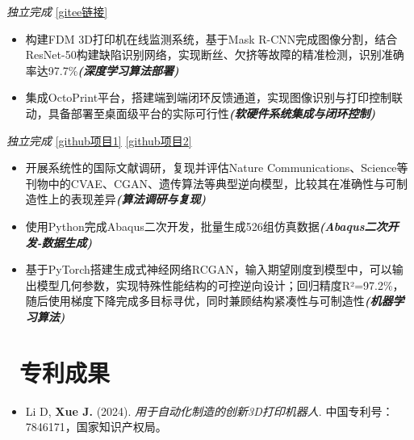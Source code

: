 \documentclass{resume}
\newcommand{\fapatent}{\faCopyright}
\begin{document}
\textit{独立完成} \href{https://gitee.com/jcXue/graduation-design.git}{[gitee链接]}
\begin{itemize}
  \item 构建FDM 3D打印机在线监测系统，基于Mask R-CNN完成图像分割，结合ResNet-50构建缺陷识别网络，实现断丝、欠挤等故障的精准检测，识别准确率达97.7\%\textit{\textbf{(深度学习算法部署)}}
  \item 集成OctoPrint平台，搭建端到端闭环反馈通道，实现图像识别与打印控制联动，具备部署至桌面级平台的实际可行性\textit{\textbf{(软硬件系统集成与闭环控制)}}
\end{itemize}

\textit{独立完成} \href{https://github.com/jcXue001/Multi-functional-materials-design.git}{[github项目1]} \href{https://github.com/jcXue001/RCGAN-MO.git}{[github项目2]}
\begin{itemize}
  \item 开展系统性的国际文献调研，复现并评估Nature Communications、Science等刊物中的CVAE、CGAN、遗传算法等典型逆向模型，比较其在准确性与可制造性上的表现差异\textit{\textbf{(算法调研与复现)}}
  \item 使用Python完成Abaqus二次开发，批量生成526组仿真数据\textit{\textbf{(Abaqus二次开发-数据生成)}}
  \item 基于PyTorch搭建生成式神经网络RCGAN，输入期望刚度到模型中，可以输出模型几何参数，实现特殊性能结构的可控逆向设计；回归精度R²=97.2\%，随后使用梯度下降完成多目标寻优，同时兼顾结构紧凑性与可制造性\textit{\textbf{(机器学习算法)}}
\end{itemize}

\section{\fapatent\  专利成果}
\begin{itemize}
  \item Li D, \textbf{Xue J.} (2024). \textit{用于自动化制造的创新3D打印机器人}. 中国专利号：7846171，国家知识产权局。
\end{itemize}

\end{document}
